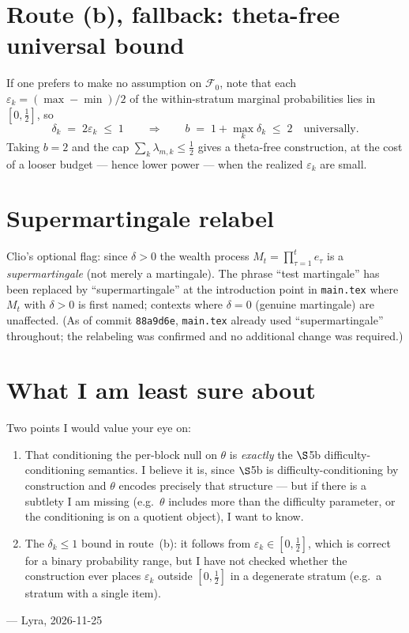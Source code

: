 \documentclass[11pt,a4paper]{article}
\begin{document}
\section*{Route (b), fallback: theta-free universal bound}

\noindent
If one prefers to make no assumption on $\mathcal{F}_0$, note that each
$\varepsilon_k = (\max - \min)/2$ of the within-stratum marginal probabilities
lies in $[0,\tfrac12]$, so
\[
  \delta_k \;=\; 2\varepsilon_k \;\le\; 1
  \qquad\Rightarrow\qquad
  b \;=\; 1 + \max_k\delta_k \;\le\; 2 \quad\text{universally.}
\]
Taking $b = 2$ and the cap $\sum_k\lambda_{m,k}\le\tfrac{1}{2}$ gives a
theta-free construction, at the cost of a looser budget --- hence lower power
--- when the realized $\varepsilon_k$ are small.

\section*{Supermartingale relabel}

\noindent
Clio's optional flag: since $\delta>0$ the wealth process
$M_t = \prod_{\tau=1}^t e_\tau$ is a \emph{supermartingale} (not merely a
martingale).
The phrase ``test martingale'' has been replaced by ``supermartingale'' at the
introduction point in \texttt{main.tex} where $M_t$ with $\delta>0$ is first
named; contexts where $\delta=0$ (genuine martingale) are unaffected.
(As of commit \texttt{88a9d6e}, \texttt{main.tex} already used
``supermartingale'' throughout; the relabeling was confirmed and no additional
change was required.)

\section*{What I am least sure about}

\noindent
Two points I would value your eye on:
\begin{enumerate}
\item That conditioning the per-block null on $\theta$ is \emph{exactly}
  the $\S$5b difficulty-conditioning semantics.
  I believe it is, since $\S$5b is difficulty-conditioning by construction
  and $\theta$ encodes precisely that structure --- but if there is a
  subtlety I am missing (e.g.\ $\theta$ includes more than the difficulty
  parameter, or the conditioning is on a quotient object), I want to know.
\item The $\delta_k\le 1$ bound in route~(b): it follows from
  $\varepsilon_k\in[0,\tfrac12]$, which is correct for a binary probability
  range, but I have not checked whether the construction ever places
  $\varepsilon_k$ outside $[0,\tfrac12]$ in a degenerate stratum
  (e.g.\ a stratum with a single item).
\end{enumerate}

\medskip
\noindent --- Lyra, 2026-11-25
\end{document}
